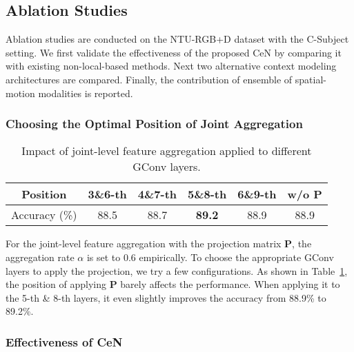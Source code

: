 \documentclass[sigconf]{acmart}
\begin{document}
\subsection{Ablation Studies}

Ablation studies are conducted on the NTU-RGB+D dataset with the C-Subject setting. We first validate the effectiveness of the proposed CeN by comparing it with existing non-local-based methods. Next two alternative context modeling architectures are compared. Finally, the contribution of ensemble of spatial-motion modalities is reported.

\subsubsection{Choosing the Optimal Position of Joint Aggregation}



\begin{table}[t]
  \centering
  \caption{Impact of joint-level feature aggregation applied to different GConv layers.}
    \begin{tabular}{c|c|c|c|c|c}
    \toprule
    Position & 3\&6-th & 4\&7-th & 5\&8-th & 6\&9-th & w/o $\mathbf{P}$ \\
    \midrule
    Accuracy (\%) & 88.5  & 88.7  & \textbf{89.2} & 88.9  & 88.9 \\
    \bottomrule
    \end{tabular}\label{tab:feat-agg}\end{table}

For the joint-level feature aggregation with the projection matrix $\mathbf P$, the aggregation rate $\alpha$ is set to 0.6 empirically. To choose the appropriate GConv layers to apply the projection, we try a few configurations. As shown in Table~\ref{tab:feat-agg}, the position of applying $\mathbf P$ barely affects the performance. When applying it to the 5-th \& 8-th layers, it even slightly improves the accuracy from 88.9\% to 89.2\%.

\subsubsection{Effectiveness of CeN}
\end{document}
